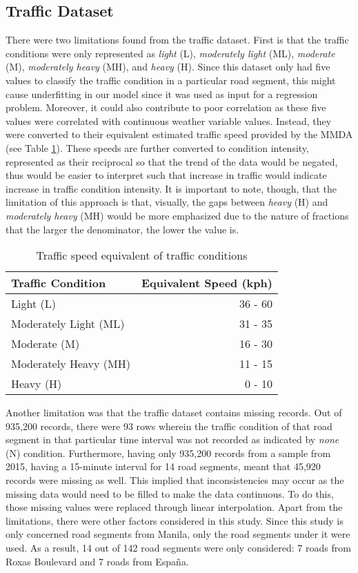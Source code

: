 \subsection{Traffic Dataset}
There were two limitations found from the traffic dataset. First is that the traffic conditions were only represented as \textit{light} (L), \textit{moderately light} (ML), \textit{moderate} (M), \textit{moderately heavy} (MH), and \textit{heavy} (H). Since this dataset only had five values to classify the traffic condition in a particular road segment, this might cause underfitting in our model since it was used as input for a regression problem. Moreover, it could also contribute to poor correlation as these five values were correlated with continuous weather variable values. Instead, they were converted to their equivalent estimated traffic speed provided by the MMDA (see Table \ref{table_traffic_condition}). These speeds are further converted to condition intensity, represented as their reciprocal so that the trend of the data would be negated, thus would be easier to interpret such that increase in traffic would indicate increase in traffic condition intensity. It is important to note, though, that the limitation of this approach is that, visually, the gaps between \textit{heavy} (H) and \textit{moderately heavy} (MH) would be more emphasized due to the nature of fractions that the larger the denominator, the lower the value is.


\begin{table}[!t]
\centering
\caption{Traffic speed equivalent of traffic conditions}
\label{table_traffic_condition}
\begin{tabular}{|l|r|}
\hline
\textbf{Traffic Condition} & \multicolumn{1}{l|}{\textbf{Equivalent Speed (kph)}} \\ \hline
Light (L) & 36 - 60 \\ \hline
Moderately Light (ML) & 31 - 35 \\ \hline
Moderate (M) & 16 - 30 \\ \hline
Moderately Heavy (MH) & 11 - 15 \\ \hline
Heavy (H) & 0 - 10 \\ \hline
\end{tabular}
\end{table}

Another limitation was that the traffic dataset contains missing records. Out of 935,200 records, there were 93 rows wherein the traffic condition of that road segment in that particular time interval was not recorded as indicated by \textit{none} (N) condition. Furthermore, having only 935,200 records from a sample from 2015, having a 15-minute interval for 14 road segments, meant that 45,920 records were missing as well. This implied that inconsistencies may occur as the missing data would need to be filled to make the data continuous. To do this, those missing values were replaced through linear interpolation. 
Apart from the limitations, there were other factors considered in this study. Since this study is only concerned road segments from Manila, only the road segments under it were used. As a result, 14 out of 142 road segments were only considered: 7 roads from Roxas Boulevard and 7 roads from España.

